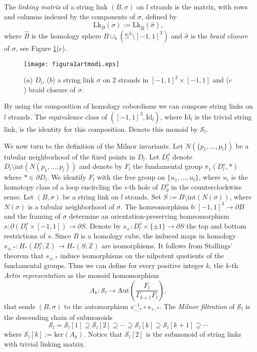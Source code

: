 \documentclass[10pt]{amsart}
\numberwithin{equation}{section}
\numberwithin{equation}{section}
\theoremstyle{definition}
\begin{document}
The \emph{linking matrix} of a string link $(B,\sigma)$ on $l$ strands is the matrix, with rows and columns indexed by the components of $\sigma$, defined by
$$\text{Lk}_B(\sigma):= \text{Lk}_{\hat{B}}(\hat{\sigma}),$$
where $\hat{B}$ is the homology sphere $B\cup_b(\mathbb{S}^3\setminus \left[-1,1\right]^3)$ and $\hat{\sigma}$ is the \emph{braid closure} of $\sigma$, see Figure \ref{figura4.1}($c$).

\begin{figure}[ht!]
										\centering
                        \texttt{[image: figura1artmodi.eps]}
												\caption{($a$) $D_l$, ($b$) a string link $\sigma$ on $2$ strands in $[-1,1]^2\times[-1,1]$ and ($c$) braid closure of $\sigma$.} 
												\label{figura4.1}
\end{figure}
         


By using the composition of homology cobordisms we can compose string links on $l$ strands. The equivalence class of $([-1,1]^3, \text{Id}_l)$, where $\text{Id}_l$ is the trivial string link, is the identity for this composition. Denote this monoid by $\mathcal{S}_l$.

We now turn to the definition of the Milnor invariants. Let $N(\{p_1,\ldots,p_l\})$ be a tubular neighborhood of the fixed points in $D_l$. Let  $D_l^o$ denote $D_l\setminus\text{int}(N(p_1,\ldots, p_l))$ and denote by $F_l$ the fundamental group $\pi_1(D_l^o, *)$ where $*\in\partial D_l$. We identify $F_l$ with the free group on $\{u_1,\ldots,u_l\}$, where $u_i$ is the homotopy class of a loop encircling the $i$-th hole of $D_g^o$ in the counterclockwise sense. Let $(B,\sigma)$ be a string link on $l$ strands. Set $S:=B\setminus \text{int}(N(\sigma))$, where $N(\sigma)$ is a tubular neighborhood of $\sigma$. The homeomorphism $b:\left[-1,1\right]^3\rightarrow\partial B$ and the framing of $\sigma$ determine an orientation-preserving homeomorphism $s:\partial(D_l^o\times\left[-1,1\right])\rightarrow\partial S$. Denote by $s_{\pm}:D_l^o\times\{\pm1\}\rightarrow\partial S$ the top and bottom restrictions of $s$. Since $B$ is a homology cube, the induced maps in homology $s_{\pm,*}:H_*(D_l^o;\mathbb{Z})\rightarrow H_*(S;\mathbb{Z})$ are isomorphisms. It follows from Stallings' theorem \cite[Theorem 3.4]{MR0175956} that $s_{\pm,*}$ induce isomorphisms on the nilpotent quotients of the fundamental groups. Thus we can define for every positive integer $k$, the $k$-th \emph{Artin representation} as the monoid homomorphism
\begin{equation}\label{ecuacion4.4}%
A_k: \mathcal{S}_l\longrightarrow \text{Aut}\left(\frac{F_l}{\Gamma_{k+1}F_l} \right),
\end{equation}
that sends $(B,\sigma)$ to the automorphism $s_{-,*}^{-1}\circ s_{+,*}$. The \emph{Milnor filtration} of $\mathcal{S}_l$ is the descending chain of submonoids  
$$\mathcal{S}_l=\mathcal{S}_l[1]\supseteq\mathcal{S}_l[2]\supseteq\cdots\supseteq\mathcal{S}_l[k]\supseteq\mathcal{S}_l[k+1]\supseteq\cdots$$
where $\mathcal{S}_l[k]:=\text{ker} (A_k)$. Notice that  $\mathcal{S}_l[2]$ is the submonoid of string links with trivial linking matrix. 
\end{document}
